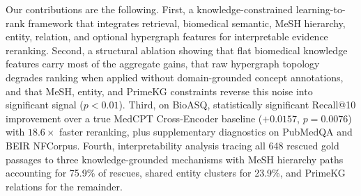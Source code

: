 Our contributions are the following. First, a knowledge-constrained learning-to-rank framework that integrates retrieval, biomedical semantic, MeSH hierarchy, entity, relation, and optional hypergraph features for interpretable evidence reranking. Second, a structural ablation showing that flat biomedical knowledge features carry most of the aggregate gains, that raw hypergraph topology degrades ranking when applied without domain-grounded concept annotations, and that MeSH, entity, and PrimeKG constraints reverse this noise into significant signal ($p < 0.01$). Third, on BioASQ, statistically significant Recall@10 improvement over a true MedCPT Cross-Encoder baseline ($+0.0157$, $p=0.0076$) with $18.6\times$ faster reranking, plus supplementary diagnostics on PubMedQA and BEIR NFCorpus. Fourth, interpretability analysis tracing all 648 rescued gold passages to three knowledge-grounded mechanisms with MeSH hierarchy paths accounting for 75.9\% of rescues, shared entity clusters for 23.9\%, and PrimeKG relations for the remainder.
